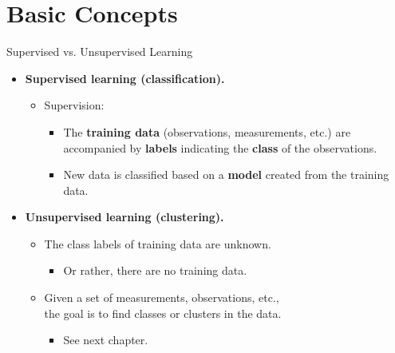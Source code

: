 \section{Basic Concepts}

\begin{frame}{Supervised vs. Unsupervised Learning}
  \begin{itemize}
  \item \textbf{\color{airforceblue}Supervised learning (classification).}
    \begin{itemize}
    \item Supervision:
      \begin{itemize}
      \item The \textbf{training data} (observations, measurements, etc.) are accompanied by \textbf{labels} indicating the \textbf{class} of the observations.
      \item New data is classified based on a \textbf{model} created from the training data.
      \end{itemize}
    \end{itemize}
  \item \textbf{\color{airforceblue}Unsupervised learning (clustering).}
    \begin{itemize}
    \item The class labels of training data are unknown.
      \begin{itemize}
      \item Or rather, there are no training data.
      \end{itemize}
    \end{itemize}
    \begin{itemize}
    \item Given a set of measurements, observations, etc., \\ the goal is to find classes or clusters in the data.
      \begin{itemize}
      \item See next chapter.
      \end{itemize}
    \end{itemize}
  \end{itemize}
\end{frame}

